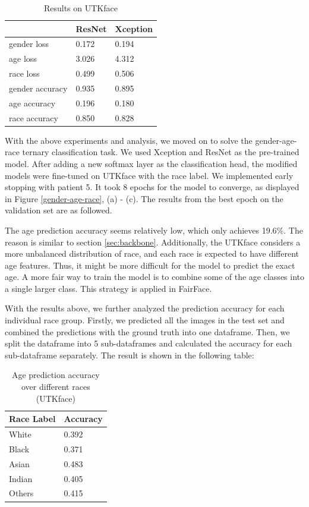 \documentclass[DIV=calc, paper=a4, fontsize=10pt, twocolumn]{article}
\begin{document}
	\begin{table}[H]
		\centering
		\begin{tabular}{|l|l|l|}
			\hline
			 & ResNet& Xception \\ \hline
			gender loss     & 0.172 & 0.194\\ \hline
			age loss        & 3.026 & 4.312\\ \hline
			race loss       & 0.499 & 0.506\\ \hline
			gender accuracy & 0.935 & 0.895\\ \hline
			age accuracy    & 0.196 & 0.180\\ \hline
			race accuracy   & 0.850 & 0.828\\ \hline
		\end{tabular}
		\caption{Results on UTKface}
	\end{table}

	With the above experiments and analysis, we moved on to solve the gender-age-race ternary classification task. We used Xception and ResNet as the pre-trained model. After adding a new softmax layer as the classification head, the modified models were fine-tuned on UTKface with the race label. We implemented early stopping with patient 5. It took 8 epochs for the model to converge, as displayed in Figure \ref{gender-age-race}, (a) - (c). The results from the best epoch on the validation set are as followed.
	
	The age prediction accuracy seems relatively low, which only achieves 19.6\%. The reason is similar to section \ref{sec:backbone}. Additionally, the UTKface considers a more unbalanced distribution of race, and each race is expected to have different age features. Thus, it might be more difficult for the model to predict the exact age. A more fair way to train the model is to combine some of the age classes into a single larger class. This strategy is applied in FairFace.
	
	With the results above, we further analyzed the prediction accuracy for each individual race group. Firstly, we predicted all the images in the test set and combined the predictions with the ground truth into one dataframe. Then, we split the dataframe into 5 sub-dataframes and calculated the accuracy for each sub-dataframe separately. The result is shown in the following table:
	
	\begin{table}[H]
		\centering
		\begin{tabular}{|l|l|}
			\hline
			\textbf{Race Label} & \textbf{Accuracy} \\ \hline
			White  &  0.392 \\ \hline
			Black  & 0.371 \\ \hline
			Asian  & 0.483 \\ \hline 
			Indian & 0.405 \\ \hline 
			Others & 0.415 \\ \hline 
		\end{tabular}
		\caption{Age prediction accuracy over different races (UTKface)}
	\end{table}
\end{document}
